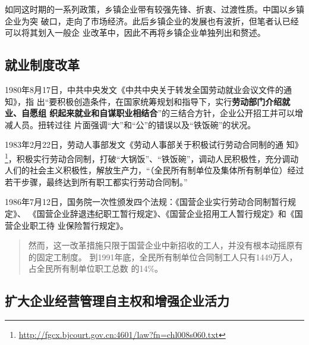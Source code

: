 如同这时期的一系列政策，乡镇企业带有较强先锋、折衷、过渡性质。中国以乡镇企业为突
破口，走向了市场经济。此后乡镇企业的发展也有波折，但笔者认已经可以将其划入一般企
业改革中，因此不再将乡镇企业单独列出和赘述。

\subsection{就业制度改革}

1980年8月17日，中共中央发文《中共中央关于转发全国劳动就业会议文件的通知》，指
出“要积极创造条件，在国家统筹规划和指导下，实行\textbf{劳动部门介绍就业、自愿组
  织起来就业和自谋职业相结合}”的三结合方针，企业公开招工并可以增减人员。扭转过往
片面强调“大”和“公”的错误以及“铁饭碗”的状况。

1983年2月22日，劳动人事部发文《劳动人事部关于积极试行劳动合同制的通
知》\footnote{\url{http://fgcx.bjcourt.gov.cn:4601/law?fn=chl008s060.txt}}，积极实行劳动合同制，打破“大锅饭”、“铁饭碗”，调动人民积极性，充分调动人们的社会主义积极性，解放生产力，“（全民所有制单位及集体所有制单位）经过若干步骤，最终达到所有职工都实行劳动合同制。”

1986年7月12日，国务院一次性颁发四个法规：《国营企业实行劳动合同制暂行规定》、
《国营企业辞退违纪职工暂行规定》、《国营企业招用工人暂行规定》和《国营企业职工待
业保险暂行规定》。
\begin{quotation}
  然而，这一改革措施只限于国营企业中新招收的工人，并没有根本动摇原有的固定工制度。
  到1991年底，全民所有制单位合同制工人只有1449万人，占全民所有制单位职工总数
  的14\%。\cite{laodongzhiduyuanfang}
\end{quotation}



\subsection{扩大企业经营管理自主权和增强企业活力}

